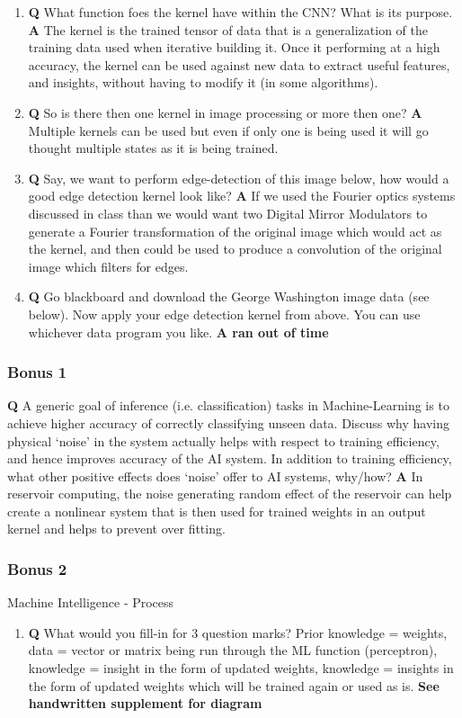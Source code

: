 \documentclass[main.tex]{subfiles}
\begin{document}
\begin{enumerate}
	\begin{enumerate}
	    \item \textbf{Q} What function foes the kernel have within the CNN? What is its purpose. \textbf{A} The kernel is the trained tensor of data that is a generalization of the training data used when iterative building it. Once it performing at a high accuracy, the kernel can be used against new data to extract useful features, and insights, without having to modify it (in some algorithms).
	    \item \textbf{Q} So is there then one kernel in image processing or more then one? \textbf{A} Multiple kernels can be used but even if only one is being used it will go thought multiple states as it is being trained.
	    \item \textbf{Q} Say, we want to perform edge-detection of this image below, how would a good edge detection kernel look like? \textbf{A} If we used the Fourier optics systems discussed in class than we would want two Digital Mirror Modulators to generate a Fourier transformation of the original image which would act as the kernel, and then could be used to produce a convolution of the original image which filters for edges.
	    \item \textbf{Q} Go blackboard and download the George Washington image data (see below). Now apply your edge detection kernel from above. You can use whichever data program you like. \textbf{A ran out of time} 
 	\end{enumerate}
\end{enumerate}

\subsubsection{Bonus 1} \textbf{Q} A generic goal of inference (i.e. classification) tasks in Machine-Learning is to achieve higher accuracy of correctly classifying unseen data. Discuss why having physical ‘noise’ in the system actually helps with respect to training efficiency, and hence improves accuracy of the AI system. In addition to training efficiency, what other positive effects does ‘noise’ offer to AI systems, why/how? \textbf{A} In reservoir computing, the noise generating random effect of the reservoir can help create a nonlinear system that is then used for trained weights in an output kernel and helps to prevent over fitting.

\subsubsection{Bonus 2} Machine Intelligence - Process
\begin{enumerate}
    \item \textbf{Q} What would you fill-in for 3 question marks?  Prior knowledge = weights, data = vector or matrix being run through the ML function (perceptron), knowledge = insight in the form of updated weights, knowledge = insights in the form of updated weights which will be trained again or used as is. \textbf{See handwritten supplement for diagram}
\end{enumerate}
\end{document}

